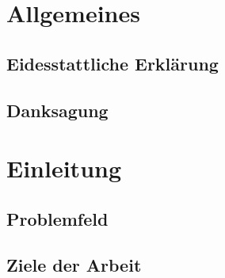 




\tableofcontents
\newpage

\section*{Allgemeines}
\label{sec:Allgemeines}
  \subsection*{Eidesstattliche Erklärung}
  \label{ssec:Eidesstattliche Erklärung}

  \subsection*{Danksagung}
  \label{ssec:Danksagung}

\section{Einleitung}
\label{sec:Einleitung}
  \subsection{Problemfeld}
  \label{ssec:Problemfeld}

  \subsection{Ziele der Arbeit}
  \label{ssec:Ziele der Arbeit}

